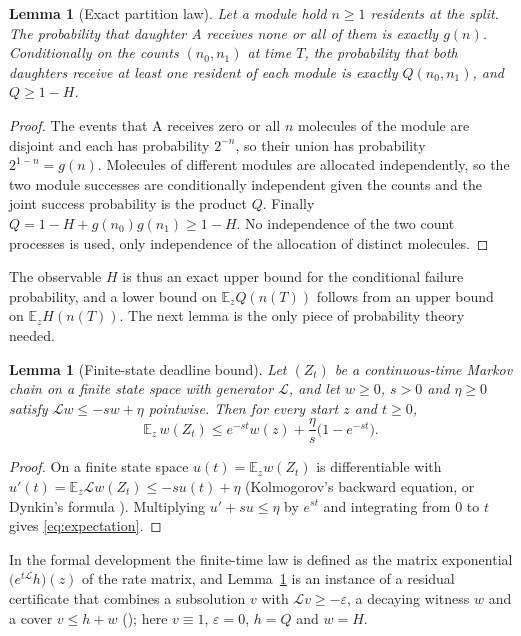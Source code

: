 \documentclass[11pt,a4paper]{article}
\theoremstyle{plain}
\newtheorem{lemma}[theorem]{Lemma}
\theoremstyle{definition}
\theoremstyle{remark}
\newcommand{\EE}{\mathbb E}
\newcommand{\cL}{\mathcal L}
\begin{document}
\begin{lemma}[Exact partition law]\label{lem:partition}
Let a module hold $n\ge1$ residents at the split. The probability that daughter A receives none or all of them is exactly $g(n)$. Conditionally on the counts $(n_0,n_1)$ at time $T$, the probability that both daughters receive at least one resident of each module is exactly $Q(n_0,n_1)$, and $Q\ge1-H$.
\end{lemma}
\begin{proof}
The events that A receives zero or all $n$ molecules of the module are disjoint and each has probability $2^{-n}$, so their union has probability $2^{1-n}=g(n)$. Molecules of different modules are allocated independently, so the two module successes are conditionally independent given the counts and the joint success probability is the product $Q$. Finally $Q=1-H+g(n_0)g(n_1)\ge1-H$. No independence of the two count processes is used, only independence of the allocation of distinct molecules.
\end{proof}

The observable $H$ is thus an exact upper bound for the conditional failure probability, and a lower bound on $\EE_zQ(n(T))$ follows from an upper bound on $\EE_zH(n(T))$. The next lemma is the only piece of probability theory needed.

\begin{lemma}[Finite-state deadline bound]\label{lem:deadline}
Let $(Z_t)$ be a continuous-time Markov chain on a finite state space with generator $\cL$, and let $w\ge0$, $s>0$ and $\eta\ge0$ satisfy $\cL w\le-sw+\eta$ pointwise. Then for every start $z$ and $t\ge0$,
\begin{equation}\label{eq:expectation}
 \EE_z\,w(Z_t)\le e^{-st}w(z)+\frac{\eta}{s}\bigl(1-e^{-st}\bigr).
\end{equation}
\end{lemma}
\begin{proof}
On a finite state space $u(t)=\EE_zw(Z_t)$ is differentiable with $u'(t)=\EE_z\cL w(Z_t)\le-su(t)+\eta$ (Kolmogorov's backward equation, or Dynkin's formula \citep{ethierkurtz1986}). Multiplying $u'+su\le\eta$ by $e^{st}$ and integrating from $0$ to $t$ gives \eqref{eq:expectation}.
\end{proof}

In the formal development the finite-time law is defined as the matrix exponential $\bigl(e^{t\cL}h\bigr)(z)$ of the rate matrix, and Lemma~\ref{lem:deadline} is an instance of a residual certificate that combines a subsolution $v$ with $\cL v\ge-\varepsilon$, a decaying witness $w$ and a cover $v\le h+w$ (); here $v\equiv1$, $\varepsilon=0$, $h=Q$ and $w=H$.
\end{document}
